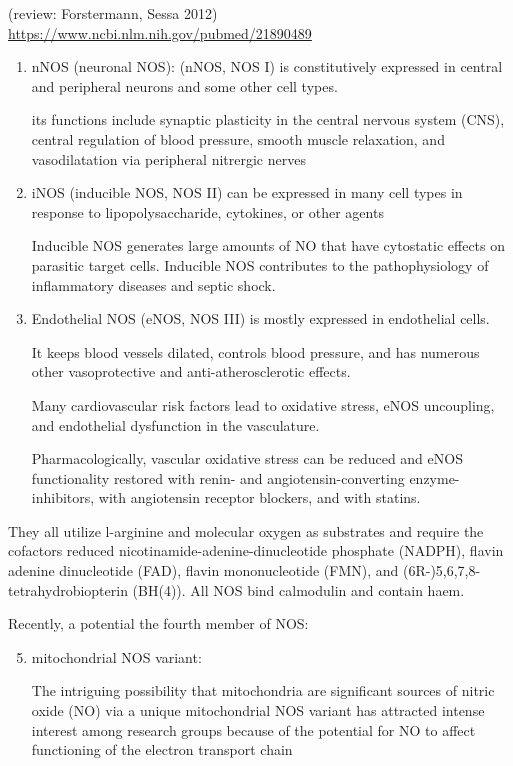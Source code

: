 (review: Forstermann, Sessa 2012)
\url{https://www.ncbi.nlm.nih.gov/pubmed/21890489}
\begin{enumerate}
  \item nNOS (neuronal NOS): (nNOS, NOS I) is constitutively expressed in
  central and peripheral neurons and some other cell types.

its functions include synaptic plasticity in the central nervous system (CNS),
central regulation of blood pressure, smooth muscle relaxation, and
vasodilatation via peripheral nitrergic nerves


  \item  iNOS (inducible NOS, NOS II) can be expressed in many cell types in
  response to lipopolysaccharide, cytokines, or other agents
  
  Inducible NOS generates large amounts of NO that have cytostatic effects on
  parasitic target cells. Inducible NOS contributes to the pathophysiology of
  inflammatory diseases and septic shock.
  
  \item Endothelial NOS (eNOS, NOS III) is mostly expressed in endothelial
  cells.
  
  It keeps blood vessels dilated, controls blood pressure, and has numerous
  other vasoprotective and anti-atherosclerotic effects.
  
  Many cardiovascular risk factors lead to oxidative stress, eNOS uncoupling,
  and endothelial dysfunction in the vasculature.
  
  Pharmacologically, vascular oxidative stress can be reduced and eNOS
  functionality restored with renin- and angiotensin-converting
  enzyme-inhibitors, with angiotensin receptor blockers, and with statins.
\end{enumerate}
They all utilize l-arginine and molecular oxygen as substrates and require the
cofactors reduced nicotinamide-adenine-dinucleotide phosphate (NADPH), flavin
adenine dinucleotide (FAD), flavin mononucleotide (FMN), and
(6R-)5,6,7,8-tetrahydrobiopterin (BH(4)). All NOS bind calmodulin and contain
haem.

Recently, a potential the fourth member of NOS:
\begin{enumerate}
  
  \setcounter{enumi}{4}
  \item mitochondrial NOS variant: 
  
  The intriguing possibility that mitochondria are significant sources of nitric
  oxide (NO) via a unique mitochondrial NOS variant has attracted intense
  interest among research groups because of the potential for NO to affect
  functioning of the electron transport chain
  
\end{enumerate}
